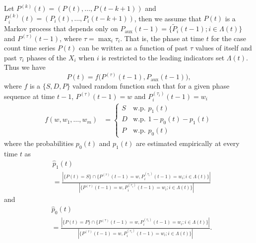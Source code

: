 \documentclass[conference,compsoc]{IEEEtran}
\newcommand{\Paux}{P_{\textrm{aux}}}
\begin{document}
Let $ P^{(k)}(t) = (P(t), \dots, P(t-k+1))$ and $P^{(k)}_i(t) =\left(P_i(t), \dots, P_i(t-k+1)\right)$,  then we assume that $P(t)$ is a Markov process that depends only on   $\Paux(t-1) = \{\tilde P_i(t-1); i\in \Lambda(t)\}$ and $ P^{(\tau)}(t-1)$, where $\tau =\max_i \tau_i$. That is, the phase at time $t$ for the case count time series $P(t)$ can be written as a function of past $\tau$ values of itself and past $\tau_i$ phases of the $X_i$ when $i$ is restricted to the leading indicators set $\Lambda(t)$. Thus we have 
\begin{equation}
    P(t) = f\big( P^{(\tau)}(t-1), \Paux(t-1) \big),
\end{equation}
where $f$ is a $ \{S, D, P\} $ valued random function such that for a given phase sequence at time $t-1$,  $P^{(\tau)}(t-1) = w$ and $ P^{(\tau_i)}_i(t-1) =w_i$ 
\begin{align*}
    f(w, w_1, \dots, w_m) 
    &= \begin{cases}
    S & \text{w.p. } p_1(t) \\
    D& \text{w.p. } 1-p_0(t)-p_1(t)\\
    P& \text{w.p. } p_0(t) 
    \end{cases}
\end{align*}
where the probabilities $p_0(t)$ and $ p_1(t)$ are estimated empirically at every time $t$ as
{\footnotesize
\begin{align*}
    &\hat{p}_1(t) \\
    & =\frac{ |\{P(t) = S\}\cap \{P^{(\tau)}(t-1) =w, P^{(\tau_i)}_i(t-1) =w_i;i\in \Lambda(t)\} |} {| \{P^{(\tau)}(t-1) =w, P^{(\tau_i)}_i(t-1) =w_i;i\in \Lambda(t)\} |}
\end{align*} }
and 
{\footnotesize
\begin{align*}
    &\hat{p}_0(t) \\
    & =\frac{ |\{P(t) = P\}\cap \{P^{(\tau)}(t-1) =w, P^{(\tau_i)}_i(t-1) =w_i;i\in \Lambda(t)\} |} {| \{P^{(\tau)}(t-1) =w, P^{(\tau_i)}_i(t-1) =w_i;i\in \Lambda(t)\} |}.
\end{align*} }
\end{document}
